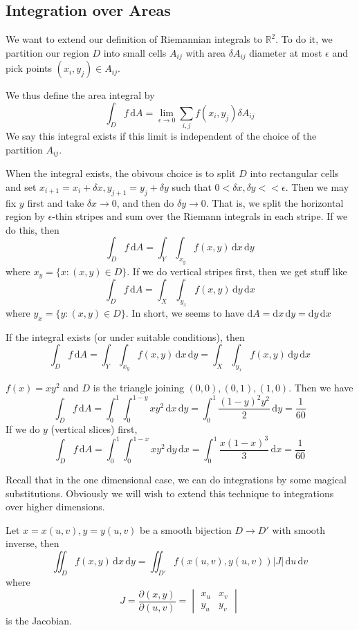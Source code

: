 \subsection{Integration over Areas}
We want to extend our definition of Riemannian integrals to $\mathbb R^2$.
To do it, we partition our region $D$ into small cells $A_{ij}$ with area $\delta A_{ij}$ diameter at most $\epsilon$ and pick points $(x_i,y_j)\in A_{ij}$.
\begin{definition}
    We thus define the area integral by
    $$\int_Df\,\mathrm dA=\lim_{\epsilon\to 0}\sum_{i,j}f(x_i,y_j)\delta A_{ij}$$
    We say this integral exists if this limit is independent of the choice of the partition $A_{ij}$.
\end{definition}
When the integral exists, the obivous choice is to split $D$ into rectangular cells and set $x_{i+1}=x_i+\delta x,y_{j+1}=y_j+\delta y$ such that $0<\delta x,\delta y<<\epsilon$.
Then we may fix $y$ first and take $\delta x\to 0$, and then do $\delta y\to 0$.
That is, we split the horizontal region by $\epsilon$-thin stripes and sum over the Riemann integrals in each stripe.
If we do this, then
$$\int_Df\,\mathrm dA=\int_Y\int_{x_y}f(x,y)\,\mathrm dx\,\mathrm dy$$
where $x_y=\{x:(x,y)\in D\}$.
If we do vertical stripes first, then we get stuff like
$$\int_Df\,\mathrm dA=\int_X\int_{y_x}f(x,y)\,\mathrm dy\,\mathrm dx$$
where $y_x=\{y:(x,y)\in D\}$.
In short, we seems to have $\mathrm dA=\mathrm dx\,\mathrm dy=\mathrm dy\,\mathrm dx$
\begin{theorem}
    If the integral exists (or under suitable conditions), then
    $$\int_Df\,\mathrm dA=\int_Y\int_{x_y}f(x,y)\,\mathrm dx\,\mathrm dy=\int_X\int_{y_x}f(x,y)\,\mathrm dy\,\mathrm dx$$
\end{theorem}
\begin{example}
    $f(x)=xy^2$ and $D$ is the triangle joining $(0,0),(0,1),(1,0)$.
    Then we have
    $$\int_Df\,\mathrm dA=\int_0^1\int_{0}^{1-y}xy^2\,\mathrm dx\,\mathrm dy=\int_0^1\frac{(1-y)^2y^2}{2}\,\mathrm dy=\frac{1}{60}$$
    If we do $y$ (vertical slices) first,
    $$\int_Df\,\mathrm dA=\int_0^1\int_0^{1-x}xy^2\,\mathrm dy\,\mathrm dx=\int_0^1\frac{x(1-x)^3}{3}\,\mathrm dx=\frac{1}{60}$$
\end{example}
Recall that in the one dimensional case, we can do integrations by some magical substitutions.
Obviously we will wish to extend this technique to integrations over higher dimensions.
\begin{proposition}
    Let $x=x(u,v),y=y(u,v)$ be a smooth bijection $D\to D'$ with smooth inverse, then
    $$\iint_D f(x,y)\,\mathrm dx\,\mathrm dy=\iint_{D'}f(x(u,v),y(u,v))|J|\,\mathrm du\,\mathrm dv$$
    where
    $$J=\frac{\partial (x,y)}{\partial (u,v)}=\begin{vmatrix}
        x_u&x_v\\
        y_u&y_v
    \end{vmatrix}$$
    is the Jacobian.
\end{proposition}
